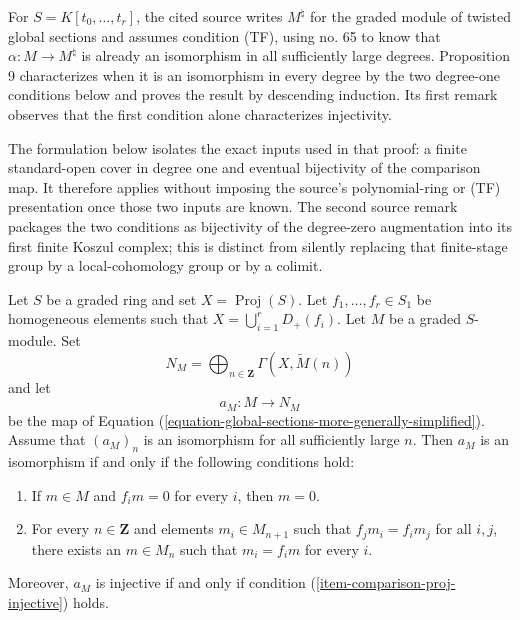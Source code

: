 \begin{lemma}
\label{lemma-comparison-proj-isomorphism}
\begin{reference}
\cite[Chapter III, \S 3, no. 67, Proposition 9 and Remarks,
pp. 260--261]{FAC}
\end{reference}
\begin{history}
For $S=K[t_0,\ldots,t_r]$, the cited source writes $M^\natural$ for the
graded module of twisted global sections and assumes condition (TF), using
no. 65 to know that $\alpha:M\to M^\natural$ is already an isomorphism in
all sufficiently large degrees. Proposition 9 characterizes when it is an
isomorphism in every degree by the two degree-one conditions below and proves
the result by descending induction. Its first remark observes that the first
condition alone characterizes injectivity.

The formulation below isolates the exact inputs used in that proof: a finite
standard-open cover in degree one and eventual bijectivity of the comparison
map. It therefore applies without imposing the source's polynomial-ring or
(TF) presentation once those two inputs are known. The second source remark
packages the two conditions as bijectivity of the degree-zero augmentation
into its first finite Koszul complex; this is distinct from silently replacing
that finite-stage group by a local-cohomology group or by a colimit.
\end{history}
Let $S$ be a graded ring and set $X=\operatorname{Proj}(S)$. Let
$f_1,\ldots,f_r\in S_1$ be homogeneous elements such that
$X=\bigcup_{i=1}^rD_+(f_i)$. Let $M$ be a graded $S$-module. Set
$$
N_M=\bigoplus_{n\in\mathbf{Z}}\Gamma(X,\widetilde M(n))
$$
and let
$$
a_M:M\longrightarrow N_M
$$
be the map of Equation
(\ref{equation-global-sections-more-generally-simplified}). Assume that
$(a_M)_n$ is an isomorphism for all sufficiently large $n$. Then $a_M$ is
an isomorphism if and only if the following conditions hold:
\begin{enumerate}
\item
\label{item-comparison-proj-injective}
If $m\in M$ and $f_i m=0$ for every $i$, then $m=0$.
\item
\label{item-comparison-proj-glue}
For every $n\in\mathbf{Z}$ and elements $m_i\in M_{n+1}$ such that
$f_jm_i=f_im_j$ for all $i,j$, there exists an $m\in M_n$ such that
$m_i=f_im$ for every $i$.
\end{enumerate}
Moreover, $a_M$ is injective if and only if condition
(\ref{item-comparison-proj-injective}) holds.
\end{lemma}

